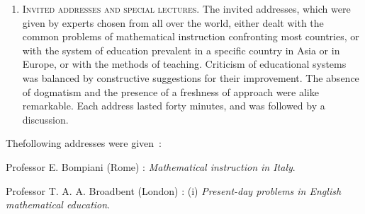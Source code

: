 \begin{enumerate}
News\pageoriginale regarding the organization of the Conference was disseminated in South Asia through the good offices of the Ministry of Natural Resources and Scientific Research of the Government of India, and the Unesco Science Co-operation office at New Delhi. Invitations to send delegates to the Conference were extended to the Governments of Burma, Ceylon, Indonesia, Malaya, Pakistan, Singapore and Thailand. Members of the International Colloquium on Zeta Functions, held at the Tata Institute of Fundamental Research on 14-21 February, 1956, were invited to participate in the Conference. Universities and research institutions in India were invited to nominate one representative each. The participation of interested mathematicians from all countries, South Asian or not, was not only welcomed, but positively encouraged. Australia, China, Poland, and the U.S.S.R., for instance, were thus represented. The Organizing Committee decided, however, that only the following participants should have the right to vote : delegates sent by the Governments of the South Asian countries, members of the National Committee for Mathematics in India, members of the Organizing Committee, and those giving invited addresses. No occasion arose, however, which called for a vote.

It was decided that the Conference should function in three tiers : (i) {\em invited addresses}, (ii) {\em working groups}, and (iii) {\em plenary sessions}.

\item \textsc{Invited addresses and special lectures.} The invited addresses, which were given by experts chosen from all over the world, either dealt with the common problems of mathematical instruction confronting most countries, or with the system of education prevalent in a specific country in Asia or in Europe, or with the methods of teaching. Criticism of educational systems was balanced by constructive suggestions for their improvement. The absence of dogmatism and the presence of a freshness of approach were alike remarkable. Each address lasted forty minutes, and was followed by a discussion.
\end{enumerate}

The\pageoriginale following addresses were given~:
\smallskip

Professor E. Bompiani (Rome) : {\em Mathematical instruction in Italy}.

Professor T. A. A. Broadbent (London) : (i) {\em Present-day problems in English mathematical education}.

